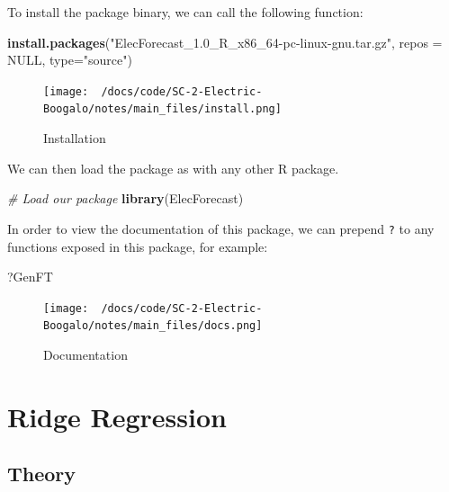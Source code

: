 \documentclass[
]{article}
\newenvironment{Shaded}{\begin{snugshade}}{\end{snugshade}}
\newcommand{\AttributeTok}[1]{\textcolor[rgb]{0.13,0.29,0.53}{#1}}
\newcommand{\CommentTok}[1]{\textcolor[rgb]{0.56,0.35,0.01}{\textit{#1}}}
\newcommand{\ConstantTok}[1]{\textcolor[rgb]{0.56,0.35,0.01}{#1}}
\newcommand{\FunctionTok}[1]{\textcolor[rgb]{0.13,0.29,0.53}{\textbf{#1}}}
\newcommand{\NormalTok}[1]{#1}
\newcommand{\StringTok}[1]{\textcolor[rgb]{0.31,0.60,0.02}{#1}}
\begin{document}
To install the package binary, we can call the following function:

\begin{Shaded}
\begin{Highlighting}[]
\FunctionTok{install.packages}\NormalTok{(}\StringTok{"ElecForecast\_1.0\_R\_x86\_64{-}pc{-}linux{-}gnu.tar.gz"}\NormalTok{, }\AttributeTok{repos =} \ConstantTok{NULL}\NormalTok{, }\AttributeTok{type=}\StringTok{"source"}\NormalTok{)}
\end{Highlighting}
\end{Shaded}

\begin{figure}
\centering
\texttt{[image: ~/docs/code/SC-2-Electric-Boogalo/notes/main\_files/install.png]}
\caption{Installation}
\end{figure}

We can then load the package as with any other R package.

\begin{Shaded}
\begin{Highlighting}[]
\CommentTok{\# Load our package}
\FunctionTok{library}\NormalTok{(ElecForecast)}
\end{Highlighting}
\end{Shaded}

In order to view the documentation of this package, we can prepend
\texttt{?} to any functions exposed in this package, for example:

\begin{Shaded}
\begin{Highlighting}[]
\NormalTok{?GenFT}
\end{Highlighting}
\end{Shaded}

\begin{figure}
\centering
\texttt{[image: ~/docs/code/SC-2-Electric-Boogalo/notes/main\_files/docs.png]}
\caption{Documentation}
\end{figure}

\hypertarget{ridge-regression}{%
\section{Ridge Regression}\label{ridge-regression}}

\hypertarget{theory}{%
\subsection{Theory}\label{theory}}
\end{document}
